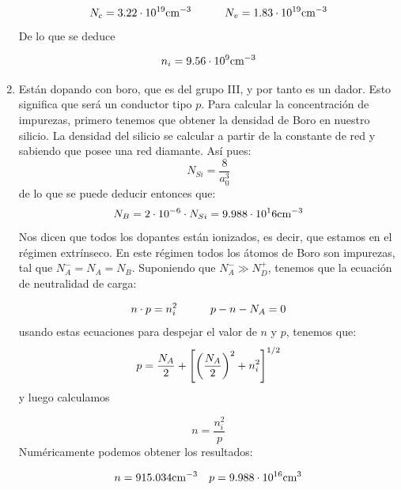 \begin{texercise}
\begin{enumerate}[label=\alph*)]
		\begin{equation}
			N_c = 3.22 \cdot 10^{19} \text{cm}^{-3} \quad \quad \quad 	N_v = 1.83 \cdot 10^{19} \text{cm}^{-3}
		\end{equation}
		De lo que se deduce

		\begin{equation}
			n_i = 9.56 \cdot 10^9 \text{cm}^{-3}
		\end{equation}


		\item Están dopando con boro, que es del grupo III, y por tanto es un dador. Esto significa que será un conductor tipo $p$. Para calcular la concentración de impurezas, primero tenemos que obtener la densidad de Boro en nuestro silicio. La densidad del silicio se calcular a partir de la constante de red y sabiendo que posee una red diamante. Así pues:
		\begin{equation}
			N_{Si} = \frac{8}{a_0^3} 
		\end{equation}
		de lo que se puede deducir entonces que:
		\begin{equation}
			N_B = 2\cdot 10^{-6} \cdot N_{Si} = 9.988 \cdot 10^16 \text{cm}^{-3}
		\end{equation}
		Nos dicen que todos los dopantes están ionizados, es decir, que estamos en el régimen extrínseco. En este régimen todos los átomos de Boro son impurezas, tal que $N_A^-=N_A=N_B$. Suponiendo que $N_A^- \gg N_D^+$, tenemos que la ecuación de neutralidad de carga:

		\begin{equation}
			n\cdot p = n_i^2 \quad \quad \quad p-n-N_A = 0 
		\end{equation}
		usando estas ecuaciones para despejar el valor de $n$ y $p$, tenemos que:	
		\begin{equation}
			p = \frac{N_A}{2} + \left[ \left( \frac{N_A}{2} \right)^2 + n_i^2 \right]^{1/2} 
		\end{equation}
		y luego calculamos 

		\begin{equation}
			n = \frac{n_i^2}{p}
		\end{equation}
		Numéricamente podemos obtener los resultados:

		\begin{equation}
			n=915.034 \text{cm}^{-3} \quad p = 9.988 \cdot 10^{16} \text{cm}^3
		\end{equation}



\end{enumerate}
\end{texercise}

